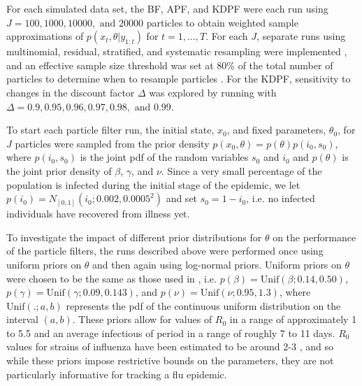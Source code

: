 \documentclass{elsarticle}
\begin{document}
For each simulated data set, the BF, APF, and KDPF were each run using $J = 100, 1000, 10000, \mbox{ and } 20000$ particles to obtain weighted sample approximations of $p(x_t,\theta|y_{1:t})$ for $t = 1,\ldots,T$. For each $J$, separate runs using multinomial, residual, stratified, and systematic resampling were implemented \citep{smcUtils}, and an effective sample size threshold was set at 80\% of the total number of particles to determine when to resample particles \citep{Liu:Chen:Wong:reje:1998}. For the KDPF, sensitivity to changes in the discount factor $\Delta$ was explored by running with $\Delta = 0.9, 0.95, 0.96, 0.97, 0.98, \mbox{ and } 0.99$.

To start each particle filter run, the initial state, $x_0$, and fixed parameters, $\theta_0$, for $J$ particles were sampled from the prior density $p(x_0,\theta) = p(\theta)p(i_0,s_0)$, where $p(i_0,s_0)$ is the joint pdf of the random variables $s_0$ and $i_0$ and $p(\theta)$ is the joint prior density of $\beta$, $\gamma$, and $\nu$. Since a very small percentage of the population is infected during the initial stage of the epidemic, we let $p(i_0) = N_{[0,1]}(i_0;0.002,0.0005^2)$ and set $s_0 = 1 - i_0$, i.e. no infected individuals have recovered from illness yet.

To investigate the impact of different prior distributions for $\theta$ on the performance of the particle filters, the runs described above were performed once using uniform priors on $\theta$ and then again using log-normal priors. Uniform priors on $\theta$ were chosen to be the same as those used in \citet{skvortsov2012monitoring}, i.e. \hbox{$p(\beta) = \mbox{Unif}(\beta; 0.14, 0.50)$}, \hbox{$p(\gamma) = \mbox{Unif}(\gamma; 0.09, 0.143)$}, and \hbox{$p(\nu) = \mbox{Unif}(\nu; 0.95, 1.3)$}, where $\mbox{Unif}(.; a, b)$ represents the pdf of the continuous uniform distribution on the interval $(a,b)$. These priors allow for values of $R_0$ in a range of approximately 1 to 5.5 and an average infectious of period in a range of roughly 7 to 11 days. $R_0$ values for strains of influenza have been estimated to be around 2-3 \citep{mills2004influenza, heff2005repratio, zhang2011flu}, and so while these priors impose restrictive bounds on the parameters, they are not particularly informative for tracking a flu epidemic.
\end{document}
